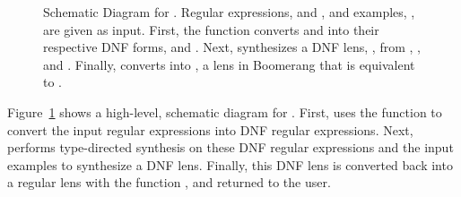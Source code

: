 \documentclass[acmsmall,screen]{acmart}
\begin{document}
\begin{figure}
  \caption{Schematic Diagram for \Optician{}.  Regular expressions, \Regex{} and
    \RegexAlt{}, and examples, \Examples{}, are given as input.
    First, the function \ToDNFRegex{} converts \Regex{} and \RegexAlt{} into
    their respective DNF forms, \DNFRegex{} and \DNFRegexAlt{}.
    Next, \SynthDNFLens{} synthesizes a DNF lens, \DNFLens{}, from \Regex{},
    \RegexAlt{}, and \Examples{}.
    Finally, \ToLens{} converts \DNFLens{} into \Lens{}, a lens in Boomerang
    that is equivalent to \DNFLens{}.}
  \label{fig:schematic-diagram-synthesis}
\end{figure}

Figure~\ref{fig:schematic-diagram-synthesis} shows a high-level,
schematic diagram for \Optician{}.
First, \Optician{} uses the function \ToDNFRegex{} to convert the input
regular expressions into DNF regular expressions.  Next,
\SynthDNFLens{} performs type-directed synthesis on these DNF regular
expressions and the input examples to synthesize a DNF lens.  Finally, this DNF lens is
converted back into a regular lens with the function \ToLens{}, and returned to the user.
\end{document}
